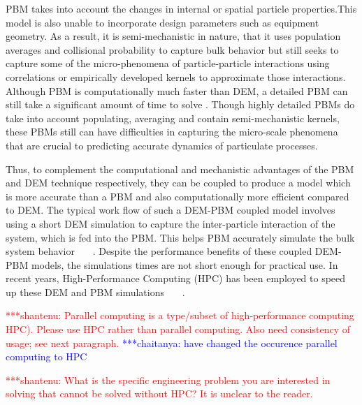 \documentclass[preprint,11pt,authoryear]{elsarticle}
\newcommand{\jhanote}[1]{ {\textcolor{red} { ***shantenu: #1 }}}
\newcommand{\csnote}[1]{ {\textcolor{blue} { ***chaitanya: #1 }}}
\newcommand{\jhanote}[1]{ {\textcolor{red} { ***shantenu: #1 }}}
\newcommand{\csnote}[1]{}
\begin{document}
PBM takes into account the changes in internal or spatial particle
properties.This model is also unable to incorporate design parameters such 
as equipment geometry. As a result, it is semi-mechanistic in nature, 
that it uses population averages and collisional probability to capture 
bulk behavior but still seeks to capture
some of the micro-phenomena of particle-particle interactions using
correlations or empirically developed kernels to approximate those
interactions. Although PBM is computationally much faster than DEM, a detailed PBM can
still take a significant amount of time to solve \citep{Barrasso2013}. 
Though highly detailed PBMs do take into account
populating, averaging and contain semi-mechanistic kernels, these PBMs still
can have difficulties in capturing the micro-scale phenomena that are crucial
to predicting accurate dynamics of particulate processes.

Thus, to complement the computational and mechanistic advantages of the PBM and DEM
technique respectively, they can be coupled to produce a model which is 
more accurate than a PBM and also computationally more efficient compared to DEM. 
The typical work flow of such a
DEM-PBM coupled model involves using a short DEM simulation to capture the
inter-particle interaction of the system, which is fed into the PBM. This helps 
PBM accurately simulate the bulk system behavior~\citep{Goldschmidt2003}
~\citep{Reinhold2012}~\citep{Barrasso2013}. Despite the performance benefits of
these coupled DEM-PBM models, the simulations times are not short enough for 
practical use. In recent years, High-Performance Computing (HPC) has 
been employed to speed up  these DEM and PBM simulations
~\citep{Gunawan2008}~\citep{Prakash2013a}~\citep{Bettencourt2017}.

\jhanote{Parallel computing is a type/subset of high-performance computing
HPC). Please use HPC rather than parallel computing. Also need consistency of
usage; see next paragraph.} \csnote{have changed the occurence parallel computing to HPC}


\jhanote{What is the specific engineering problem you are interested in
solving that cannot be solved without HPC? It is unclear to the reader.} 
\end{document}
